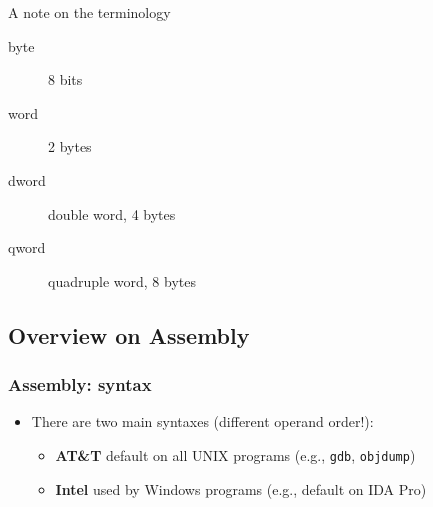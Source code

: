 \documentclass[]{beamer}
\begin{document}
\begin{frame}{A note on the terminology}

\begin{description}
\item[byte] 8 bits
\item[word] 2 bytes
\item[dword] double word, 4 bytes
\item[qword] quadruple word, 8 bytes
\end{description}

\end{frame}

\subsection{Overview on Assembly}

\begin{frame}
  \frametitle{Assembly: syntax}
  \begin{itemize}
  \item There are two main syntaxes (different operand order!):
  \begin{itemize}
  \item {\bf AT\&T} default on all UNIX programs (e.g., \texttt{gdb}, \texttt{objdump})
  \item {\bf Intel} used by Windows programs (e.g., default on IDA Pro)
  \end{itemize}
  \end{itemize}
\end{frame}

\end{document}
